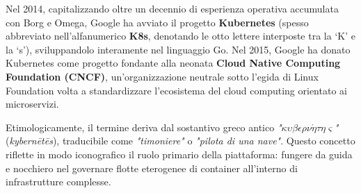 \documentclass[11pt, a4paper]{article}
\begin{document}
Nel 2014, capitalizzando oltre un decennio di esperienza operativa accumulata con Borg e Omega, Google ha avviato il progetto \textbf{Kubernetes} (spesso abbreviato nell'alfanumerico \textbf{K8s}, denotando le otto lettere interposte tra la `K' e la `s'), sviluppandolo interamente nel linguaggio Go. Nel 2015, Google ha donato Kubernetes come progetto fondante alla neonata \textbf{Cloud Native Computing Foundation (CNCF)}, un'organizzazione neutrale sotto l'egida di Linux Foundation volta a standardizzare l'ecosistema del cloud computing orientato ai microservizi.

Etimologicamente, il termine deriva dal sostantivo greco antico \emph{"$\kappa\upsilon\beta\epsilon\rho\nu\acute{\eta}\tau\eta\varsigma$"} (\emph{kybernētēs}), traducibile come \emph{"timoniere"} o \emph{"pilota di una nave"}. Questo concetto riflette in modo iconografico il ruolo primario della piattaforma: fungere da guida e nocchiero nel governare flotte eterogenee di container all'interno di infrastrutture complesse.

\end{document}
